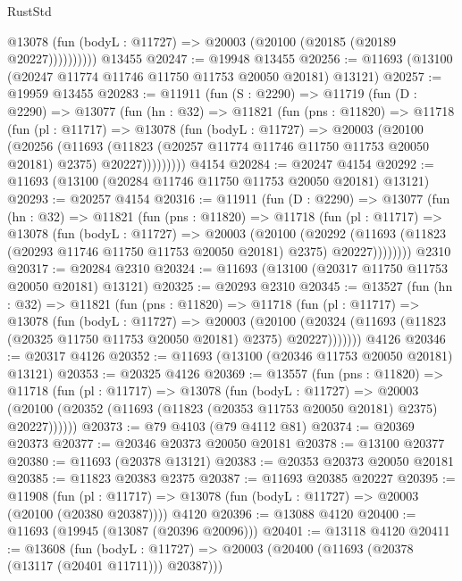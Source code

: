\begin{lexlean}{RustStd}
\begin{coremodule}
              @13078 (fun (bodyL : @11727) => @20003 (@20100 (@20185 (@20189 @20227))))))))))
    @13455
@20247 := @19948 @13455
@20256 := @11693 (@13100 (@20247 @11774 @11746 @11750 @11753 @20050 @20181) @13121)
@20257 := @19959 @13455
@20283 := @11911
    (fun (S : @2290) =>
    @11719
      (fun (D : @2290) =>
      @13077
        (fun (hn : @32) =>
        @11821
          (fun (pns : @11820) =>
          @11718
            (fun (pl : @11717) =>
            @13078
              (fun (bodyL : @11727) =>
              @20003
                (@20100
                  (@20256
                    (@11693
                      (@11823 (@20257 @11774 @11746 @11750 @11753 @20050 @20181) @2375)
                      @20227)))))))))
    @4154
@20284 := @20247 @4154
@20292 := @11693 (@13100 (@20284 @11746 @11750 @11753 @20050 @20181) @13121)
@20293 := @20257 @4154
@20316 := @11911
    (fun (D : @2290) =>
    @13077
      (fun (hn : @32) =>
      @11821
        (fun (pns : @11820) =>
        @11718
          (fun (pl : @11717) =>
          @13078
            (fun (bodyL : @11727) =>
            @20003
              (@20100
                (@20292
                  (@11693 (@11823 (@20293 @11746 @11750 @11753 @20050 @20181) @2375) @20227))))))))
    @2310
@20317 := @20284 @2310
@20324 := @11693 (@13100 (@20317 @11750 @11753 @20050 @20181) @13121)
@20325 := @20293 @2310
@20345 := @13527
    (fun (hn : @32) =>
    @11821
      (fun (pns : @11820) =>
      @11718
        (fun (pl : @11717) =>
        @13078
          (fun (bodyL : @11727) =>
          @20003
            (@20100
              (@20324 (@11693 (@11823 (@20325 @11750 @11753 @20050 @20181) @2375) @20227)))))))
    @4126
@20346 := @20317 @4126
@20352 := @11693 (@13100 (@20346 @11753 @20050 @20181) @13121)
@20353 := @20325 @4126
@20369 := @13557
    (fun (pns : @11820) =>
    @11718
      (fun (pl : @11717) =>
      @13078
        (fun (bodyL : @11727) =>
        @20003 (@20100 (@20352 (@11693 (@11823 (@20353 @11753 @20050 @20181) @2375) @20227))))))
@20373 := @79 @4103 (@79 @4112 @81)
@20374 := @20369 @20373
@20377 := @20346 @20373 @20050 @20181
@20378 := @13100 @20377
@20380 := @11693 (@20378 @13121)
@20383 := @20353 @20373 @20050 @20181
@20385 := @11823 @20383 @2375
@20387 := @11693 @20385 @20227
@20395 := @11908
    (fun (pl : @11717) => @13078 (fun (bodyL : @11727) => @20003 (@20100 (@20380 @20387))))
    @4120
@20396 := @13088 @4120
@20400 := @11693 (@19945 (@13087 (@20396 @20096)))
@20401 := @13118 @4120
@20411 := @13608
    (fun (bodyL : @11727) => @20003 (@20400 (@11693 (@20378 (@13117 (@20401 @11711))) @20387)))

\end{coremodule}
\end{lexlean}
